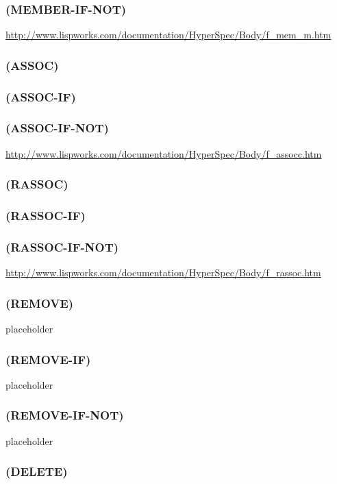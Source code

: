 \documentclass[11pt]{article}
\begin{document}
\subsubsection{(MEMBER-IF-NOT)}
\label{sec-4-15-16}

\url{http://www.lispworks.com/documentation/HyperSpec/Body/f_mem_m.htm}
\subsubsection{(ASSOC)}
\label{sec-4-15-17}
\subsubsection{(ASSOC-IF)}
\label{sec-4-15-18}
\subsubsection{(ASSOC-IF-NOT)}
\label{sec-4-15-19}

\url{http://www.lispworks.com/documentation/HyperSpec/Body/f_assocc.htm}
\subsubsection{(RASSOC)}
\label{sec-4-15-20}
\subsubsection{(RASSOC-IF)}
\label{sec-4-15-21}
\subsubsection{(RASSOC-IF-NOT)}
\label{sec-4-15-22}

\url{http://www.lispworks.com/documentation/HyperSpec/Body/f_rassoc.htm}
\subsubsection{(REMOVE)}
\label{sec-4-15-23}

placeholder
\subsubsection{(REMOVE-IF)}
\label{sec-4-15-24}

placeholder
\subsubsection{(REMOVE-IF-NOT)}
\label{sec-4-15-25}

placeholder
\subsubsection{(DELETE)}
\label{sec-4-15-26}
\end{document}
